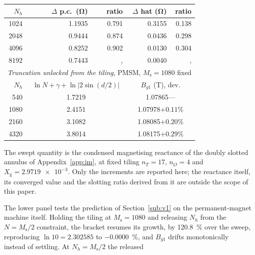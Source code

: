 \documentclass[10pt,a4paper,twocolumn]{article}
\newcommand{\Xg}{X_{\mathrm{g}}}
\theoremstyle{plain}
\theoremstyle{remark}
\begin{document}
\begin{table}[!t]
\centering
\begin{threeparttable}
\footnotesize
\begin{tabular}{rrrrr}
\toprule
$N_h$ & $\Delta$ p.c.\ (\si{\ohm}) & ratio
      & $\Delta$ hat (\si{\ohm}) & ratio \\
\midrule
\num{1024} & \num{1.1935} & \num{0.791} & \num{0.3155} & \num{0.138}\\
\num{2048} & \num{0.9444} & \num{0.874} & \num{0.0436} & \num{0.298}\\
\num{4096} & \num{0.8252} & \num{0.902} & \num{0.0130} & \num{0.304}\\
\num{8192} & \num{0.7443} & , & \num{0.0040} &, \\
\midrule
\multicolumn{5}{l}{\emph{Truncation unlocked from the tiling}, PMSM,
$M_{\mathrm{s}}=\num{1080}$ fixed\tnote{b}}\\
$N_h$ & \multicolumn{2}{c}{$\ln N+\gamma+\ln|2\sin(d/2)|$}
      & \multicolumn{2}{c}{$B_{g1}$ (\si{\tesla}), dev.}\\
\num{540}  & \multicolumn{2}{c}{\num{1.7219}} & \multicolumn{2}{c}{\num{1.07865}\quad ---}\\
\num{1080} & \multicolumn{2}{c}{\num{2.4151}} & \multicolumn{2}{c}{\num{1.07978}\quad $+0.11\%$}\\
\num{2160} & \multicolumn{2}{c}{\num{3.1082}} & \multicolumn{2}{c}{\num{1.08085}\quad $+0.20\%$}\\
\num{4320} & \multicolumn{2}{c}{\num{3.8014}} & \multicolumn{2}{c}{\num{1.08175}\quad $+0.29\%$}\\
\bottomrule
\end{tabular}
\begin{tablenotes}[flushleft]\footnotesize
\item The swept
quantity is the condensed magnetising reactance of the doubly slotted
annulus of Appendix~\ref{app:im}, at fixed tiling $n_T=17$, $n_O=4$ and
$\Xg=\num{2.9719e-3}$. Only the increments are reported here; the
reactance itself, its converged value and the slotting ratio derived
from it are outside the scope of this paper.
\item[b] The lower panel tests the prediction of
Section~\ref{sub:v1} on the permanent-magnet machine itself. Holding the
tiling at $M_{\mathrm{s}}=\num{1080}$ and releasing $N_h$ from the
$N=M_{\mathrm{s}}/2$ constraint, the bracket resumes its growth, by
\SI{120.8}{\percent} over the sweep, reproducing
$\ln 10=\num{2.302585}$ to \SI{-0.0000}{\percent}, and $B_{g1}$ drifts
monotonically instead of settling. At $N_h=M_{\mathrm{s}}/2$ the released

\end{tablenotes}
\end{threeparttable}
\end{table}
\end{document}
